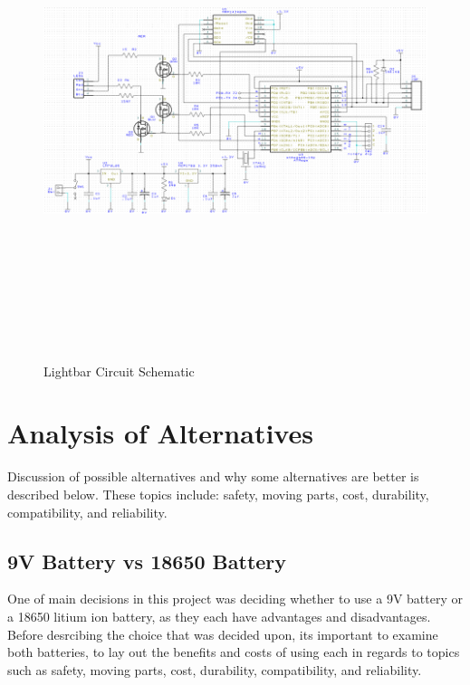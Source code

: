 \documentclass[12pt]{article}
\begin{document}
{{{{{			\begin{figure}[ht!]
			\centering
			\includegraphics[width=170mm, height=145mm]{assets/circuit_schematic.png}
			\caption{Lightbar Circuit Schematic \label{overflow}}
		\end{figure}
		
		\clearpage

\section{Analysis of Alternatives}
	Discussion of possible alternatives and why some alternatives are better is described below. These topics include: safety, moving parts, cost, durability, compatibility, and reliability.
	
	\subsection{9V Battery vs 18650 Battery}
	One of main decisions in this project was deciding whether to use a 9V battery or a 18650 litium ion battery, as they each have advantages and disadvantages. Before desrcibing the choice that was decided upon, its important to examine both batteries, to lay out the benefits and costs of using each in regards to topics such as safety, moving parts, cost, durability, compatibility, and reliability.\\
	
}}}}}
\end{document}
